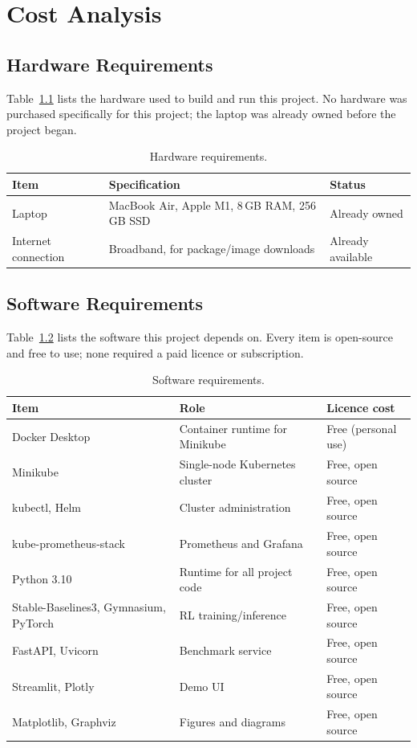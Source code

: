 \chapter{Cost Analysis}
\label{ch:cost}

\section{Hardware Requirements}
\label{sec:cost-hardware}

Table~\ref{tab:cost-hardware} lists the hardware used to build and run this
project. No hardware was purchased specifically for this project; the
laptop was already owned before the project began.

\begin{table}[H]
\centering
\caption{Hardware requirements.}
\label{tab:cost-hardware}
\begin{tabular}{lll}
\toprule
Item & Specification & Status \\
\midrule
Laptop & MacBook Air, Apple M1, 8\,GB RAM, 256\,GB SSD & Already owned \\
Internet connection & Broadband, for package/image downloads & Already available \\
\bottomrule
\end{tabular}
\end{table}

\section{Software Requirements}
\label{sec:cost-software}

Table~\ref{tab:cost-software} lists the software this project depends on.
Every item is open-source and free to use; none required a paid licence
or subscription.

\begin{table}[H]
\centering
\caption{Software requirements.}
\label{tab:cost-software}
\begin{tabular}{lll}
\toprule
Item & Role & Licence cost \\
\midrule
Docker Desktop & Container runtime for Minikube & Free (personal use) \\
Minikube & Single-node Kubernetes cluster & Free, open source \\
kubectl, Helm & Cluster administration & Free, open source \\
kube-prometheus-stack & Prometheus and Grafana & Free, open source \\
Python 3.10 & Runtime for all project code & Free, open source \\
Stable-Baselines3, Gymnasium, PyTorch & RL training/inference & Free, open source \\
FastAPI, Uvicorn & Benchmark service & Free, open source \\
Streamlit, Plotly & Demo UI & Free, open source \\
Matplotlib, Graphviz & Figures and diagrams & Free, open source \\
\bottomrule
\end{tabular}
\end{table}

